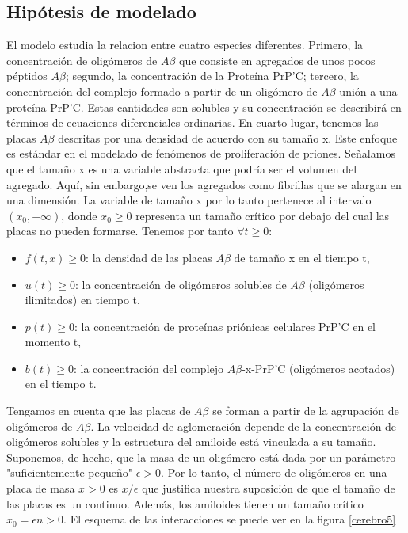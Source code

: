 \documentclass[1p]{elsarticle}
\begin{document}
\subsection{Hipótesis de modelado} El modelo estudia la relacion entre cuatro especies diferentes. Primero, la concentración de oligómeros de $A\beta$
que consiste en agregados de unos pocos péptidos $A\beta$; segundo, la concentración de la Proteína PrP'C; tercero, la concentración del complejo formado a partir de un oligómero de $A\beta$
unión a una proteína PrP'C. Estas cantidades son solubles y su concentración se describirá en términos de ecuaciones diferenciales ordinarias. En cuarto lugar, tenemos las
placas $A\beta$ descritas por una densidad de acuerdo con su tamaño x. Este enfoque
es estándar en el modelado de fenómenos de proliferación de priones. Señalamos que el tamaño x es una variable abstracta que podría
ser el volumen del agregado. Aquí, sin embargo,se ven los agregados como fibrillas que se
alargan en una dimensión. La variable de tamaño x por lo tanto pertenece al intervalo $(x_0, +\infty)$,
donde $x_0\geq 0$ representa un tamaño crítico por debajo del cual las placas no pueden formarse. Tenemos por tanto $\forall t\geq0$:
\begin{itemize}
	\item  $f (t, x) \geq 0$: la densidad de las placas $A\beta$ de tamaño x en el tiempo t,
	\item   $u (t) \geq 0$: la concentración de oligómeros solubles de $A\beta$ (oligómeros ilimitados) en
	tiempo t,
	\item  $p (t) \geq 0$: la concentración de proteínas priónicas celulares PrP'C en el momento t,
	\item  $b (t) \geq 0$: la concentración del complejo $A\beta$-x-PrP'C (oligómeros acotados) en el tiempo t.
\end{itemize}

Tengamos en cuenta que las placas de $A\beta$ se forman a partir de la agrupación de oligómeros de $A\beta$.
La velocidad de aglomeración depende de la concentración de oligómeros solubles y la
estructura del amiloide está vinculada a su tamaño. 
Suponemos, de hecho, que la masa de un oligómero está dada por un parámetro "suficientemente pequeño"
 $\epsilon> 0$. Por lo tanto, el número de oligómeros en una placa de masa $x> 0$ es
$x / \epsilon$ que justifica nuestra suposición de que el tamaño de las placas es un continuo. Además,
los amiloides tienen un tamaño crítico $x_0 = \epsilon n> 0$.
 El esquema de las interacciones se puede ver en la figura \ref{cerebro5}
\end{document}
